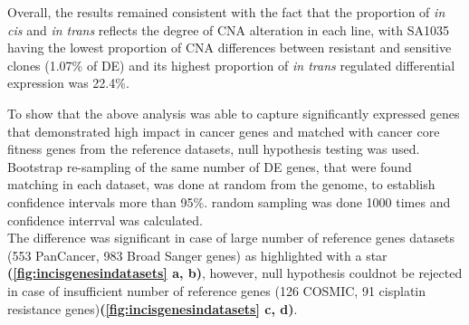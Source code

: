 
 Overall, the results remained consistent with the fact that the proportion of \textit{in cis} and \textit{in trans} reflects the degree of CNA alteration in each line, with SA1035 having the lowest proportion of CNA differences between resistant and sensitive clones (1.07\% of DE) and its highest proportion of \textit{in trans} regulated differential expression was 22.4\%.
 
 To show that the above analysis was able to capture significantly expressed genes that demonstrated high impact in cancer genes and matched with cancer core fitness genes from the reference datasets, null hypothesis testing was used. Bootstrap re-sampling of the same number of DE genes, that were found matching in each dataset, was done at random from the genome, to establish confidence intervals more than 95\%. random sampling was done 1000 times and confidence interrval was calculated.
\\ 
 The difference was significant in case of large number of reference genes datasets (553 PanCancer, 983 Broad Sanger genes) as highlighted with a star \textbf{(\autoref{fig:incisgenesindatasets} a, b)}, however, null hypothesis couldnot be rejected in case of insufficient number of reference genes (126 COSMIC, 91 cisplatin resistance genes)\textbf{(\autoref{fig:incisgenesindatasets} c, d)}.






 
